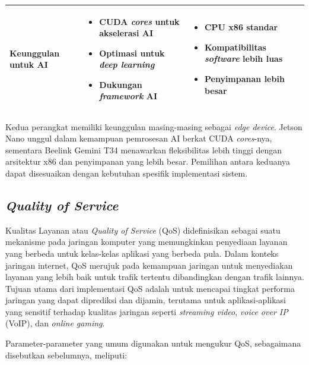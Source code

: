 \begin{table}[htbp]
\begin{tabular}{|p{3cm}|p{5cm}|p{5cm}|}
    Keunggulan untuk AI & \begin{itemize}[nolistsep]
      \item CUDA \emph{cores} untuk akselerasi AI
      \item Optimasi untuk \emph{deep learning}
      \item Dukungan \emph{framework} AI
    \end{itemize} & \begin{itemize}[nolistsep]
      \item CPU x86 standar
      \item Kompatibilitas \emph{software} lebih luas
      \item Penyimpanan lebih besar
    \end{itemize} \\
    \hline
  \end{tabular}
\end{table}

Kedua perangkat memiliki keunggulan masing-masing sebagai \emph{edge device}. Jetson Nano unggul dalam kemampuan pemrosesan AI berkat CUDA \emph{cores}-nya, sementara Beelink Gemini T34 menawarkan fleksibilitas lebih tinggi dengan arsitektur x86 dan penyimpanan yang lebih besar. Pemilihan antara keduanya dapat disesuaikan dengan kebutuhan spesifik implementasi sistem.

\subsection{\emph{Quality of Service}}

Kualitas Layanan atau \emph{Quality of Service} (QoS) didefinisikan sebagai suatu mekanisme pada jaringan komputer yang memungkinkan penyediaan layanan yang berbeda untuk kelas-kelas aplikasi yang berbeda pula. Dalam konteks jaringan internet, QoS merujuk pada kemampuan jaringan untuk menyediakan layanan yang lebih baik untuk trafik tertentu dibandingkan dengan trafik lainnya. Tujuan utama dari implementasi QoS adalah untuk mencapai tingkat performa jaringan yang dapat diprediksi dan dijamin, terutama untuk aplikasi-aplikasi yang sensitif terhadap kualitas jaringan seperti \emph{streaming video}, \emph{voice over IP} (VoIP), dan \emph{online gaming}.

Parameter-parameter yang umum digunakan untuk mengukur QoS, sebagaimana disebutkan sebelumnya, meliputi:

